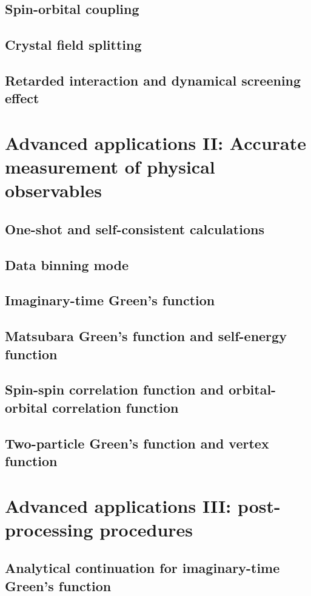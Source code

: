\documentclass[10pt]{book}
\begin{document}
\subsection{Spin-orbital coupling}
\subsection{Crystal field splitting}
\subsection{Retarded interaction and dynamical screening effect}
\section{Advanced applications II: Accurate measurement of physical observables}
\subsection{One-shot and self-consistent calculations}
\subsection{Data binning mode}
\subsection{Imaginary-time Green's function}
\subsection{Matsubara Green's function and self-energy function}
\subsection{Spin-spin correlation function and orbital-orbital correlation function}
\subsection{Two-particle Green's function and vertex function}
\section{Advanced applications III: post-processing procedures}
\subsection{Analytical continuation for imaginary-time Green's function}
\end{document}
